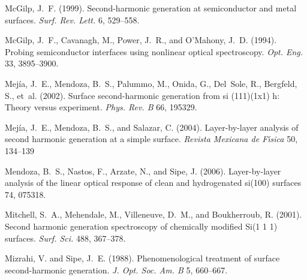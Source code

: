 \documentclass[utf8]{frontiersSCNS}
\begin{document}
\begin{thebibliography}{40}
McGilp, J.~F. (1999).
\newblock Second-harmonic generation at semiconductor and metal surfaces.
\newblock \emph{Surf. Rev. Lett.} 6, 529--558.
\newblock {}

McGilp, J.~F., Cavanagh, M., Power, J.~R., and O'Mahony, J.~D. (1994).
\newblock Probing semiconductor interfaces using nonlinear optical
  spectroscopy.
\newblock \emph{Opt. Eng.} 33, 3895--3900.
\newblock {}

Mej{\'i}a, J.~E., Mendoza, B.~S., Palummo, M., Onida, G., Del~Sole, R.,
  Bergfeld, S., et~al. (2002).
\newblock Surface second-harmonic generation from si (111)(1x1) h: Theory
  versus experiment.
\newblock \emph{Phys. Rev. B} 66, 195329.
\newblock {}

Mej{\'i}a, J.~E., Mendoza, B.~S., and Salazar, C. (2004).
\newblock Layer-by-layer analysis of second harmonic generation at a simple
  surface.
\newblock \emph{Revista Mexicana de F\'{\i}sica} 50, 134--139

Mendoza, B.~S., Nastos, F., Arzate, N., and Sipe, J. (2006).
\newblock Layer-by-layer analysis of the linear optical response of clean and
  hydrogenated si(100) surfaces 74, 075318.
\newblock {}

Mitchell, S.~A., Mehendale, M., Villeneuve, D.~M., and Boukherroub, R. (2001).
\newblock Second harmonic generation spectroscopy of chemically modified {Si}(1
  1 1) surfaces.
\newblock \emph{Surf. Sci.} 488, 367--378.
\newblock {}

Mizrahi, V. and Sipe, J.~E. (1988).
\newblock Phenomenological treatment of surface second-harmonic generation.
\newblock \emph{J. Opt. Soc. Am. B} 5, 660--667.
\newblock {}


\end{thebibliography}
\end{document}
